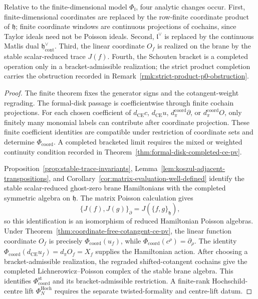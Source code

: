 \documentclass[11pt]{memoir}
\begin{document}
\begin{thm}
  Relative to the finite-dimensional model
  \(\Phi_{\mathfrak l}\), four analytic changes occur.  First,
  finite-dimensional coordinates are replaced by the row-finite
  coordinate product of \(\mathfrak h\); finite coordinate windows are
  continuous projections of cochains, since Taylor ideals need not be
  Poisson ideals.  Second, \(\mathfrak l^\vee\) is replaced by the continuous Matlis dual
  \(\mathfrak h^\vee_{\mathrm{cont}}\).  Third, the linear coordinate
  \(O_f\) is realized on the brane by the stable scalar-reduced trace
  \(J(f)\).  Fourth, the Schouten bracket is a completed operation
  only in a bracket-admissible realization; the strict product
  completion carries the obstruction recorded in
  Remark~\ref{rmk:strict-product-p0-obstruction}.
\end{thm}

\begin{proof}
  The finite theorem fixes the generator signs and the cotangent-weight
  regrading.  The formal-disk passage is coefficientwise through
  finite cochain projections.  For each
  chosen coefficient of
  \(d_{\mathrm{CE}}c\), \(d_{\mathrm{CE}}u\), \(d_\pi^{\mathrm{coord}}\partial\), or
  \(d_\pi^{\mathrm{coord}}O\), only finitely many monomial labels can contribute after
  coordinate projection.  These finite coefficient identities are compatible
  under restriction of coordinate sets and determine
  \(\Phi_{\mathrm{coord}}\).  A completed bracketed limit requires the
  mixed or weighted continuity condition recorded in
  Theorem~\ref{thm:formal-disk-completed-ce-pv}.

  Proposition~\ref{prop:stable-trace-invariants}, Lemma~\ref{lem:koszul-adjacent-transpositions},
  and Corollary~\ref{cor:matrix-evaluation-well-defined} identify the stable
  scalar-reduced ghost-zero brane Hamiltonians with the completed symmetric
  algebra on \(\mathfrak h\). The matrix Poisson calculation gives
  \[
    \{J(f),J(g)\}_{\partial}=J(\{f,g\}_{\mathfrak h}),
  \]
  so this identification is an isomorphism of reduced Hamiltonian Poisson
  algebras. Under Theorem~\ref{thm:coordinate-free-cotangent-ce-pv}, the
  linear function coordinate \(O_f\) is precisely
  \(\Phi_{\mathrm{coord}}(u_f)\), while
  \(\Phi_{\mathrm{coord}}(c^\rho)=\partial_\rho\).  The identity
  \(\Phi_{\mathrm{coord}}(d_{\mathrm{CE}}u_f)=d_\pi O_f=X_f\)
  supplies the Hamiltonian action.  After choosing a bracket-admissible realization,
  the regraded shifted-cotangent cochains give the completed
  Lichnerowicz--Poisson complex of the stable brane algebra.  This identifies \(\Phi_{\mathrm{coord}}^{\mathrm{st}}\)
  and its bracket-admissible restriction.  A finite-rank
  Hochschild-centre lift \(\Phi_N^{\mathrm{Hoch}}\) requires the
  separate twisted-formality and centre-lift datum.


\end{proof}
\end{document}

